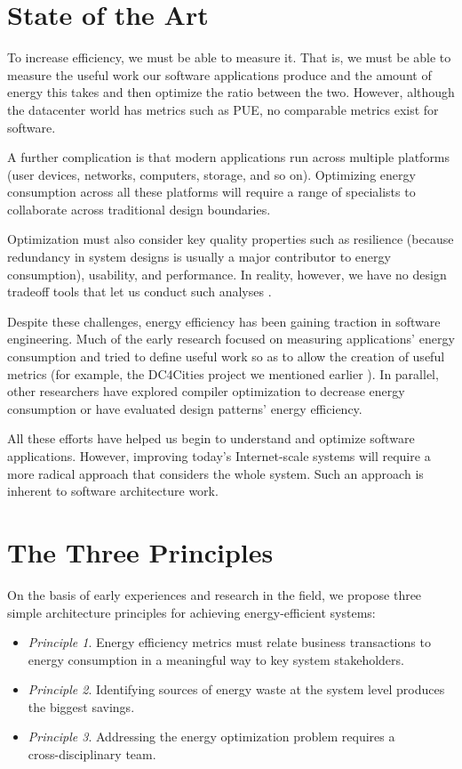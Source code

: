 \section{State of the Art}

To increase efficiency, we must be able to measure it. That is, we must be able to measure the useful work our software applications produce and the amount of energy this takes and then optimize the ratio between the two. However, although the datacenter world has metrics such as PUE, no comparable metrics exist for software.

A further complication is that modern applications run across multiple platforms (user devices, networks, computers, storage, and so on). Optimizing energy consumption across all these platforms will require a range of specialists to collaborate across traditional design boundaries.

Optimization must also consider key quality properties such as resilience (because redundancy in system designs is usually a major contributor to energy consumption), usability, and performance. In reality, however, we have no design tradeoff tools that let us conduct such analyses \cite{bashroush2016-datacentreenergy}.

Despite these challenges, energy efficiency has been gaining traction in software engineering. Much of the early research focused on measuring applications' energy consumption \cite{islam2016-energysoftwarefeatures} and tried to define useful work so as to allow the creation of useful metrics (for example, the DC4Cities project we mentioned earlier \cite{dc4cities2014_dcmetrics}). In parallel, other researchers have explored compiler optimization to decrease energy consumption or have evaluated design patterns' energy efficiency.

All these efforts have helped us begin to understand and optimize software applications. However, improving today's Internet-scale systems will require a more radical approach that considers the whole system. Such an approach is inherent to software architecture work.

\section{The Three Principles}

On the basis of early experiences and research in the field, we propose three simple architecture principles for achieving energy-efficient systems:

\begin{itemize}
\item \emph{Principle 1}. Energy efficiency metrics must relate business transactions to energy consumption in a meaningful way to key system stakeholders.
\item \emph{Principle 2}. Identifying sources of energy waste at the system level produces the biggest savings.
\item \emph{Principle 3}. Addressing the energy optimization problem requires a \\ cross-disciplinary team.
\end{itemize}

